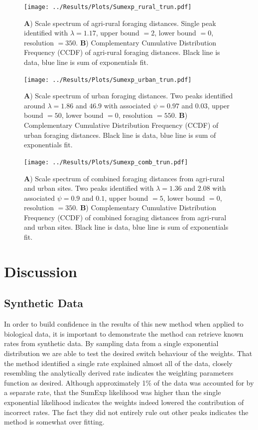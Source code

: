 \documentclass[11pt,usenames,dvipsnames]{article}
\begin{document}
\begin{figure}[H]
	\centering
	\texttt{[image: ../Results/Plots/Sumexp\_rural\_trun.pdf]}
	\caption{\textbf{A}) Scale spectrum of agri-rural foraging distances. Single peak identified with $\lambda = 1.17$, upper bound $= 2$, lower bound $= 0$, resolution $= 350$. \textbf{B}) Complementary Cumulative Distribution Frequency (CCDF) of agri-rural foraging distances. Black line is data, blue line is sum of exponentials fit.}
\end{figure}

\begin{figure}[H]
	\centering
	\texttt{[image: ../Results/Plots/Sumexp\_urban\_trun.pdf]}
	\caption{\textbf{A}) Scale spectrum of urban foraging distances. Two peaks identified around $\lambda = 1.86$ and $46.9$ with associated $\psi = 0.97$ and $0.03$, upper bound $= 50$, lower bound $= 0$, resolution $= 550$. \textbf{B}) Complementary Cumulative Distribution Frequency (CCDF) of urban foraging distances. Black line is data, blue line is sum of exponentials fit.}
\end{figure}

\begin{figure}[H]
	\centering
	\texttt{[image: ../Results/Plots/Sumexp\_comb\_trun.pdf]}
	\caption{\textbf{A}) Scale spectrum of combined foraging distances from agri-rural and urban sites. Two peaks identified with $\lambda = 1.36$ and $2.08$ with associated $\psi = 0.9$ and $0.1$, upper bound $=5$, lower bound $= 0$, resolution $= 350$. \textbf{B}) Complementary Cumulative Distribution Frequency (CCDF) of combined foraging distances from agri-rural and urban sites. Black line is data, blue line is sum of exponentials fit.}
\end{figure}

\section{Discussion}

\subsection{Synthetic Data}
In order to build confidence in the results of this new method when applied to biological data, it is important to demonstrate the method can retrieve known rates from synthetic data. By sampling data from a single exponential distribution we are able to test the desired switch behaviour of the weights. That the method identified a single rate explained almost all of the data, closely resembling the analytically derived rate indicates the weighting parameters function as desired. Although approximately 1\% of the data was accounted for by a separate rate, that the SumExp likelihood was higher than the single exponential likelihood indicates the weights indeed lowered the contribution of incorrect rates. The fact they did not entirely rule out other peaks indicates the method is somewhat over fitting.
\end{document}
